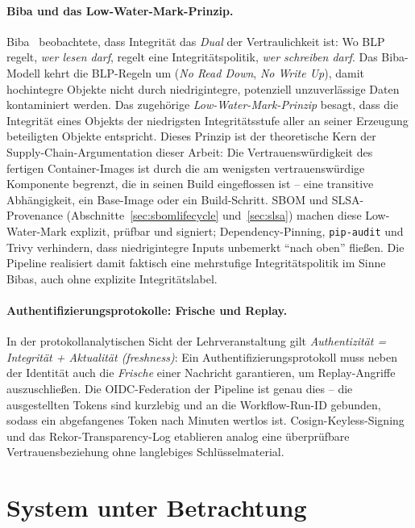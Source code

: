 \documentclass[12pt, a4paper]{scrartcl}
\begin{document}
\paragraph{Biba und das Low-Water-Mark-Prinzip.}
Biba~\cite{biba,anderson} beobachtete, dass Integrität das \emph{Dual}
der Vertraulichkeit ist: Wo BLP regelt, \emph{wer lesen darf}, regelt
eine Integritätspolitik, \emph{wer schreiben darf}. Das Biba-Modell
kehrt die BLP-Regeln um (\emph{No Read Down}, \emph{No Write Up}), damit
hochintegre Objekte nicht durch niedrigintegre, potenziell
unzuverlässige Daten kontaminiert werden. Das zugehörige
\emph{Low-Water-Mark-Prinzip} besagt, dass die Integrität eines Objekts
der niedrigsten Integritätsstufe aller an seiner Erzeugung beteiligten
Objekte entspricht. Dieses Prinzip ist der theoretische Kern der
Supply-Chain-Argumentation dieser Arbeit: Die Vertrauenswürdigkeit des
fertigen Container-Images ist durch die am wenigsten vertrauenswürdige
Komponente begrenzt, die in seinen Build eingeflossen ist -- eine
transitive Abhängigkeit, ein Base-Image oder ein Build-Schritt. SBOM und
SLSA-Provenance (Abschnitte~\ref{sec:sbomlifecycle}
und~\ref{sec:slsa}) machen diese Low-Water-Mark explizit, prüfbar und
signiert; Dependency-Pinning, \texttt{pip-audit} und Trivy verhindern,
dass niedrigintegre Inputs unbemerkt \enquote{nach oben} fließen. Die
Pipeline realisiert damit faktisch eine mehrstufige Integritätspolitik
im Sinne Bibas, auch ohne explizite Integritätslabel.

\paragraph{Authentifizierungsprotokolle: Frische und Replay.}
In der protokollanalytischen Sicht der Lehrveranstaltung gilt
\emph{Authentizität = Integrität + Aktualität (freshness)}: Ein
Authentifizierungsprotokoll muss neben der Identität auch die
\emph{Frische} einer Nachricht garantieren, um Replay-Angriffe
auszuschließen. Die OIDC-Federation der Pipeline ist genau dies -- die
ausgestellten Tokens sind kurzlebig und an die Workflow-Run-ID gebunden,
sodass ein abgefangenes Token nach Minuten wertlos ist. Cosign-Keyless-Signing
und das Rekor-Transparency-Log etablieren analog eine überprüfbare
Vertrauensbeziehung ohne langlebiges Schlüsselmaterial.


\section{System unter Betrachtung}\label{sec:system}
\end{document}
